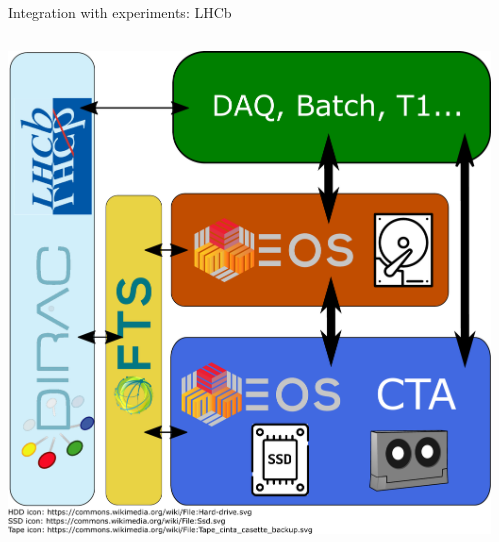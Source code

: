 \documentclass[aspectratio=169]{beamer}
\begin{document}
\begin{frame}{Integration with experiments: LHCb}
\begin{columns}
	\begin{column}{0.40\textwidth}
		\begin{center}
		  \includegraphics[keepaspectratio, height=1\textheight, width=1\textwidth]{../images/CTA_deployment_LHCb.pdf}
		\end{center}
	\end{column}
	\begin{column}{0.55\textwidth}
	\end{column}
\end{columns}
\end{frame}
\end{document}
